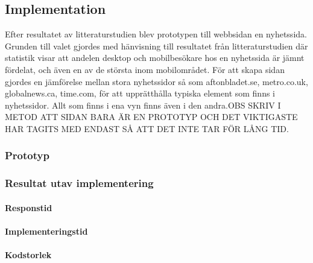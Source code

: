 \documentclass[11pt]{article}
\begin{document}
\subsection{Implementation}
Efter resultatet av litteraturstudien blev prototypen till webbsidan en nyhetssida. Grunden till valet gjordes med hänvisning till resultatet från litteraturstudien där statistik visar att andelen desktop och mobilbesökare hos en nyhetssida är jämnt fördelat, och även en av de största inom mobilområdet. För att skapa sidan gjordes en jämförelse mellan stora nyhetssidor så som aftonbladet.se, metro.co.uk, globalnews.ca, time.com, för att upprätthålla typiska element som finns i nyhetssidor. Allt som finns i ena vyn finns även i den andra.OBS SKRIV I METOD ATT SIDAN BARA ÄR EN PROTOTYP OCH DET VIKTIGASTE HAR TAGITS MED ENDAST SÅ ATT DET INTE TAR FÖR LÅNG TID.
\subsubsection{Prototyp}
\subsubsection{Resultat utav implementering}
\paragraph{Responstid}
\paragraph{Implementeringstid}
\paragraph{Kodstorlek}


\printbibliography
\end{document}
